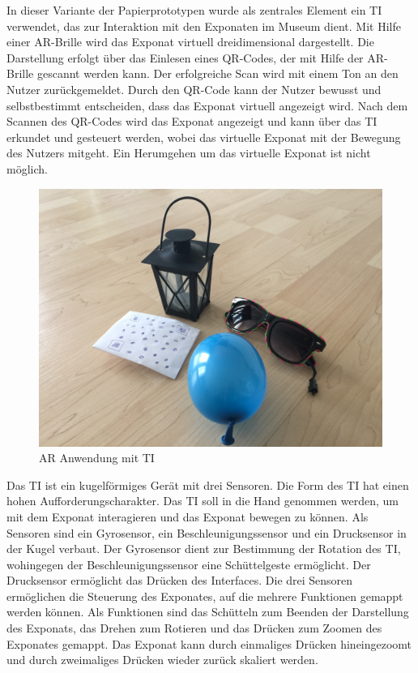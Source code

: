 \documentclass[runningheads,a4paper, 12pt]{llncs}
\begin{document}
In dieser Variante der Papierprototypen wurde als zentrales Element ein TI verwendet, das zur Interaktion mit den Exponaten im Museum dient. Mit Hilfe einer AR-Brille wird das Exponat virtuell dreidimensional dargestellt. Die Darstellung erfolgt über das Einlesen eines QR-Codes, der mit Hilfe der AR-Brille gescannt werden kann. Der erfolgreiche Scan wird mit einem Ton an den Nutzer zurückgemeldet. Durch den QR-Code kann der Nutzer bewusst und selbstbestimmt entscheiden, dass das Exponat virtuell angezeigt wird. Nach dem Scannen des QR-Codes wird das Exponat angezeigt und kann über das TI erkundet und gesteuert werden, wobei das virtuelle Exponat mit der Bewegung des Nutzers mitgeht. Ein Herumgehen um das virtuelle Exponat ist nicht möglich.\\ 

\begin{figure}[H]
	\centering
	\includegraphics[angle=0,scale=0.04]{proto2}
	\caption{AR Anwendung mit TI}
	\label{fig:prototype2}
\end{figure}

Das TI ist ein kugelförmiges Gerät mit drei Sensoren. Die Form des TI hat einen hohen Aufforderungscharakter. Das TI soll in die Hand genommen werden, um mit dem Exponat interagieren und das Exponat bewegen zu können. Als Sensoren sind ein Gyrosensor, ein Beschleunigungssensor und ein Drucksensor in der Kugel verbaut. Der Gyrosensor dient zur Bestimmung der Rotation des TI, wohingegen der Beschleunigungssensor eine Schüttelgeste ermöglicht. Der Drucksensor ermöglicht das Drücken des Interfaces. Die drei Sensoren ermöglichen die Steuerung des Exponates, auf die mehrere Funktionen gemappt werden können. Als Funktionen sind das Schütteln zum Beenden der Darstellung des Exponats, das Drehen zum Rotieren und das Drücken zum Zoomen des Exponates gemappt. Das Exponat kann durch einmaliges Drücken hineingezoomt und durch zweimaliges Drücken wieder zurück skaliert werden.\\ 
\end{document}
